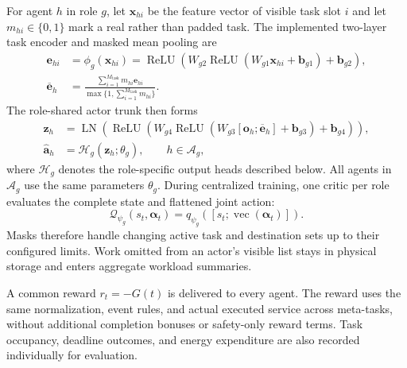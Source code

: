 \documentclass[journal]{IEEEtran}
\begin{document}
For agent $h$ in role $g$, let $\boldsymbol x_{hi}$ be the feature vector of
visible task slot $i$ and let $m_{hi}\in\{0,1\}$ mark a real rather than
padded task.  The implemented two-layer task encoder and masked mean pooling
are
\begin{equation}
\begin{aligned}
\boldsymbol e_{hi}&=\phi_g(\boldsymbol x_{hi})
=\operatorname{ReLU}\!\left(W_{g2}
 \operatorname{ReLU}(W_{g1}\boldsymbol x_{hi}+\boldsymbol b_{g1})
 +\boldsymbol b_{g2}\right),\\
\overline{\boldsymbol e}_h&=
\frac{\sum_{i=1}^{M_{\mathrm{task}}}m_{hi}\boldsymbol e_{hi}}
{\max\{1,\sum_{i=1}^{M_{\mathrm{task}}}m_{hi}\}}.
\end{aligned}
\label{eq:task_encoder}
\end{equation}
The role-shared actor trunk then forms
\begin{equation}
\begin{aligned}
\boldsymbol z_h&=\operatorname{LN}\!\left(
\operatorname{ReLU}\!\left(W_{g4}
\operatorname{ReLU}\!\left(W_{g3}
[\boldsymbol o_h;\overline{\boldsymbol e}_h]+\boldsymbol b_{g3}\right)
+\boldsymbol b_{g4}\right)\right),\\
\widehat{\boldsymbol a}_h&=\mathcal H_g(\boldsymbol z_h;\theta_g),
\qquad h\in\mathcal A_g,
\end{aligned}
\label{eq:role_actor}
\end{equation}
where $\mathcal H_g$ denotes the role-specific output heads described below.
All agents in $\mathcal A_g$ use the same parameters $\theta_g$.  During
centralized training, one critic per role evaluates the complete state and
flattened joint action:
\begin{equation}
\mathcal Q_{\psi_g}(s_t,\boldsymbol\alpha_t)
=q_{\psi_g}\!\left([s_t;\operatorname{vec}(\boldsymbol\alpha_t)]\right).
\label{eq:central_critic}
\end{equation}
Masks therefore handle changing active task and destination sets up to their
configured limits.  Work omitted from an actor's visible list stays in
physical storage and enters aggregate workload summaries.

A common reward $r_t=-G(t)$ is delivered to every agent. The reward uses the same normalization, event rules, and actual executed service across meta-tasks, without additional completion bonuses or safety-only reward terms. Task occupancy, deadline outcomes, and energy expenditure are also recorded individually for evaluation.
\end{document}
